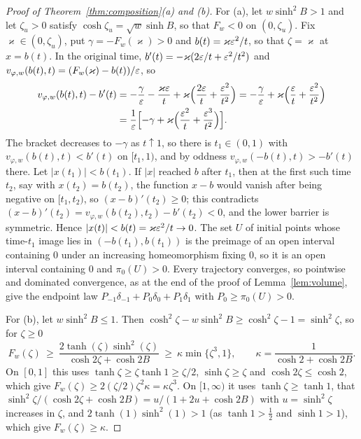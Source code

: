 \documentclass{article} %
\theoremstyle{plain}
\theoremstyle{definition}
\theoremstyle{remark}
\begin{document}
\begin{proof}[Proof of Theorem~\ref{thm:composition}(a) and (b)]
For (a), let $w\sinh^2B>1$ and let $\zeta_u>0$ satisfy $\cosh \zeta_u=\sqrt w\sinh B$, so that $F_w<0$ on
$(0,\zeta_u)$. Fix $\varkappa\in(0,\zeta_u)$, put $\gamma=-F_w(\varkappa)>0$ and $b(t)=\varkappa\varepsilon^2/t$, so that
$\zeta=\varkappa$ at $x=b(t)$. In the original time, $b'(t)=-\varkappa(2\varepsilon/t+\varepsilon^2/t^2)$ and
$v_{\varphi,w}(b(t),t)=(F_w(\varkappa)-b(t))/\varepsilon$, so
\begin{align*}
v_{\varphi,w}(b(t),t)-b'(t)
&=-\frac\gamma{\varepsilon}-\frac{\varkappa\varepsilon}{t}+\varkappa\Bigl(\frac{2\varepsilon}t+\frac{\varepsilon^2}{t^2}\Bigr)
=-\frac\gamma{\varepsilon}+\varkappa\Bigl(\frac{\varepsilon}t+\frac{\varepsilon^2}{t^2}\Bigr)\\
&=\frac1{\varepsilon}\Bigl[-\gamma+\varkappa\Bigl(\frac{\varepsilon^2}t+\frac{\varepsilon^3}{t^2}\Bigr)\Bigr].
\end{align*}
The bracket decreases to $-\gamma$ as $t\uparrow1$, so there is $t_1\in(0,1)$ with
$v_{\varphi,w}(b(t),t)<b'(t)$ on $[t_1,1)$, and by oddness $v_{\varphi,w}(-b(t),t)>-b'(t)$ there.
Let $|x(t_1)|<b(t_1)$. If $|x|$ reached $b$ after $t_1$, then at the first such time $t_2$, say with
$x(t_2)=b(t_2)$, the function $x-b$ would vanish after being negative on $[t_1,t_2)$, so
$(x-b)'(t_2)\ge0$; this contradicts
$(x-b)'(t_2)=v_{\varphi,w}(b(t_2),t_2)-b'(t_2)<0$, and the lower barrier is symmetric. Hence
$|x(t)|<b(t)=\varkappa\varepsilon^2/t\to0$. The set $U$ of initial points whose time-$t_1$ image lies in
$(-b(t_1),b(t_1))$ is the preimage of an open interval containing $0$ under an increasing
homeomorphism fixing $0$, so it is an open interval containing $0$ and $\pi_0(U)>0$. Every trajectory
converges, so pointwise and dominated convergence, as at the end of the proof of
Lemma~\ref{lem:volume}, give the endpoint law $P_{-1}\delta_{-1}+P_0\delta_0+P_1\delta_1$ with
$P_0\ge\pi_0(U)>0$.

For (b), let $w\sinh^2B\le1$. Then $\cosh^2\zeta-w\sinh^2B\ge\cosh^2\zeta-1=\sinh^2\zeta$, so for $\zeta\ge0$
\[
F_w(\zeta)\ \ge\ \frac{2\tanh(\zeta)\sinh^2(\zeta)}{\cosh2\zeta+\cosh2B}\ \ge\ \kappa\min\{\zeta^3,1\},
\qquad\kappa=\frac1{\cosh2+\cosh2B}.
\]
On $[0,1]$ this uses $\tanh \zeta\ge \zeta\tanh1\ge \zeta/2$, $\sinh \zeta\ge \zeta$ and $\cosh2\zeta\le\cosh2$, which give
$F_w(\zeta)\ge2(\zeta/2)\zeta^2\kappa=\kappa \zeta^3$. On $[1,\infty)$ it uses $\tanh \zeta\ge\tanh1$, that
$\sinh^2\zeta/(\cosh2\zeta+\cosh2B)=u/(1+2u+\cosh2B)$ with $u=\sinh^2\zeta$ increases in $\zeta$, and
$2\tanh(1)\sinh^2(1)>1$ (as $\tanh1>\tfrac12$ and $\sinh1>1$), which give $F_w(\zeta)\ge\kappa$.


\end{proof}
\end{document}
